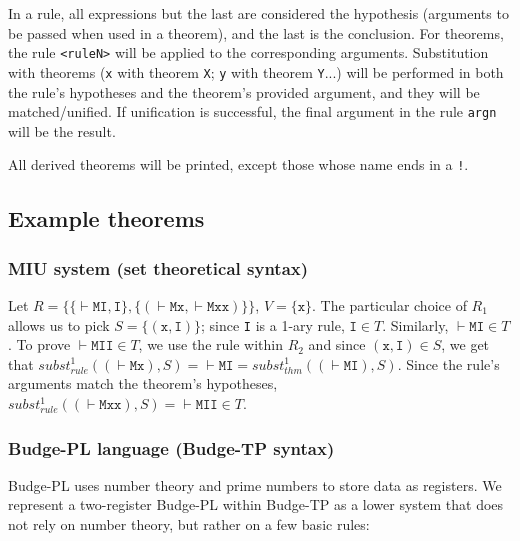 \documentclass{article}
\begin{document}
In a rule, all expressions but the last are considered the hypothesis (arguments to be passed when used in a theorem), and the last is the conclusion. For theorems, the rule \texttt{<ruleN>} will be applied to the corresponding arguments. Substitution with theorems (\texttt{x} with theorem \texttt{X}; \texttt{y} with theorem \texttt{Y}...) will be performed in both the rule's hypotheses and the theorem's provided argument, and they will be matched/unified. If unification is successful, the final argument in the rule \texttt{argn} will be the result.

All derived theorems will be printed, except those whose name ends in a \texttt{!}.

\subsection{Example theorems}

\subsubsection{MIU system\cite{b1} (set theoretical syntax)}

Let $R = \{ \{ \vdash\texttt{MI}, \texttt{I} \}, \{ (\vdash\texttt{Mx}, \vdash\texttt{Mxx}) \} \}$, $V = \{ \texttt{x} \}$. The particular choice of $R_1$ allows us to pick $S = \{ (\texttt{x}, \texttt{I}) \}$; since \texttt{I} is a 1-ary rule, $\texttt{I} \in T$. Similarly, $\vdash \texttt{MI} \in T$. To prove $\vdash\texttt{MII} \in T$, we use the rule within $R_2$ and since $(\texttt{x}, \texttt{I}) \in S$, we get that $subst_{rule}^1((\vdash\texttt{Mx}), S) = \vdash\texttt{MI} = subst_{thm}^1((\vdash\texttt{MI}), S)$. Since the rule's arguments match the theorem's hypotheses, $subst_{rule}^1((\vdash\texttt{Mxx}), S) = \vdash\texttt{MII} \in T$.

\subsubsection{Budge-PL language (Budge-TP syntax)}

Budge-PL uses number theory and prime numbers to store data as registers. We represent a two-register Budge-PL within Budge-TP as a lower system that does not rely on number theory, but rather on a few basic rules:
\end{document}
